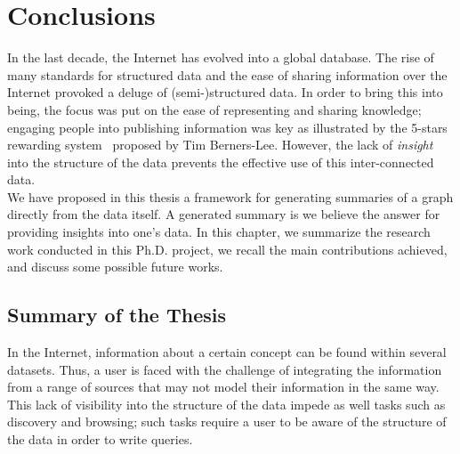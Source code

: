 \chapter{Conclusions}

In the last decade, the Internet has evolved into a global database. The rise of many standards for structured data and the ease of sharing information over the Internet provoked a deluge of (semi-)structured data. In order to bring this into being, the focus was put on the ease of representing and sharing knowledge; engaging people into publishing information was key as illustrated by the 5-stars rewarding system~\cite{5stars} proposed by Tim Berners-Lee. However, the lack of \emph{insight} into the structure of the data prevents the effective use of this inter-connected data.\\

We have proposed in this thesis a framework for generating summaries of a graph directly from the data itself. A generated summary is we believe the answer for providing insights into one's data. In this chapter, we summarize the research work conducted in this Ph.D. project, we recall the main contributions achieved, and discuss some possible future works.

\section{Summary of the Thesis}


In the Internet, information about a certain concept can be found within several datasets. Thus, a user is faced with the challenge of integrating the information from a range of sources that may not model their information in the same way. This lack of visibility into the structure of the data impede as well tasks such as discovery and browsing; such tasks require a user to be aware of the structure of the data in order to write queries.

